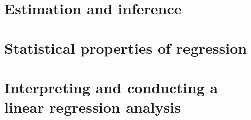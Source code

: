 \documentclass[12pt,notitlepage]{report}
\begin{document}
\chapter{Estimation and inference}






\newcommand*\FancyVerbStartString{## block}




\chapter{Statistical properties of regression}








\chapter{Interpreting and conducting a linear regression analysis}








\end{document}
